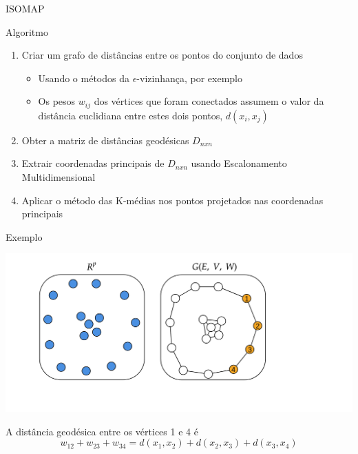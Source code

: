 \documentclass[11pt]{beamer}
\begin{document}
\begin{frame}{ISOMAP}

\begin{block}{Algoritmo}
\begin{enumerate}
\item Criar um grafo de distâncias entre os pontos do conjunto de dados 

\begin{itemize}
\item Usando o métodos da $\epsilon$-vizinhança, por exemplo
\item Os pesos $w_{ij}$ dos vértices que foram conectados assumem o valor da distância euclidiana entre estes dois pontos, $d(x_i, x_j)$
\end{itemize}

\vspace{0.2cm}
\item Obter a matriz de distâncias geodésicas $D_{nxn}$

\vspace{0.5cm}

\item Extrair coordenadas principais de $D_{nxn}$ usando Escalonamento Multidimensional

\vspace{0.5cm}

\item Aplicar o método das K-médias nos pontos projetados nas coordenadas principais

\end{enumerate}
\end{block}

\end{frame}

\begin{frame}{Exemplo}

\hspace*{1.5cm}\includegraphics[scale=0.15]{iso3}

A distância geodésica entre os vértices 1 e 4 é 
$$w_{12} + w_{23} + w_{34} = d(x_1, x_2) + d(x_2, x_3) + d(x_3, x_4)$$

\end{frame}
\end{document}
